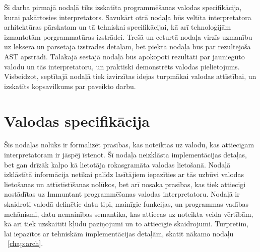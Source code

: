 \documentclass[12pt,a4paper]{report}
\begin{document}
Šī darba pirmajā nodaļā tiks izskatīta programmēšanas valodas specifikācija, kurai pakārtosies interpretators. Savukārt otrā nodaļa būs veltīta interpretatora arhitektūras pārskatam un tā tehniskai specifikācijai, kā arī tehnoloģijām izmantotām porgrammatūras izstrādei. Trešā un ceturtā nodaļa virzīs uzmanību uz leksera un parsētāja izstrādes detaļām, bet piektā nodaļa būs par rezultējošā AST apstrādi. Tālākajā sestajā nodaļā būs apokopoti rezultāti par jauniegūto valodu un tās interpretatoru, un praktiski demonstrēts valodas pielietojums. Visbeidzot, septītajā nodaļā tiek izvirzītas idejas turpmākai valodas attīstībai, un izskatīts kopsavilkums par paveikto darbu.


\newpage
\chapter{Valodas specifikācija}

Šīs nodaļas nolūks ir formalizēt prasības, kas noteiktas uz valodu, kas attiecīgam interpretatoram ir jāspēj īstenot. Šī nodaļa neizklāsta implementācijas detaļas, bet gan drīzāk kalpo kā lietotāja rokasgramāta valodas lietošanā.
Nodaļā izklāstītā informācija netikai palīdz lasītājiem iepazīties ar tās uzbūvi valodas lietošanas un attīstīstīšanas nolūkos, bet arī nosaka prasības, kas tiek attiecīgi nostādītas uz Immuntant programmēšanas valodas interpretatoru.
Nodaļā ir skaidroti valodā definētie datu tipi, mainīgie funkcijas, un programmas vadības mehānismi, datu nemainības semantika, kas attiecas uz noteikta veida vērtībām, kā arī tiek uzskaitīti kļūdu paziņojumi un to attiecīgie skaidrojumi.
Turpretim, lai iepazītos ar tehniskām implementācijas detaļām, skatīt nākamo nodaļu ~\ref{chap:arch}.
\end{document}
